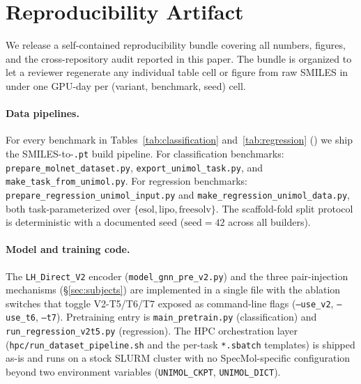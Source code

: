 
\section*{Reproducibility Artifact}
\label{sec:reproducibility}

We release a self-contained reproducibility bundle covering all numbers,
figures, and the cross-repository audit reported in this paper. The
bundle is organized to let a reviewer regenerate any individual table
cell or figure from raw SMILES in under one GPU-day per (variant,
benchmark, seed) cell.

\paragraph{Data pipelines.} For every benchmark in
Tables~\ref{tab:classification} and~\ref{tab:regression}
(\datasetlist) we ship the SMILES-to-\texttt{.pt} build pipeline. For
classification benchmarks: \texttt{prepare\_molnet\_dataset.py},
\texttt{export\_unimol\_task.py}, and \texttt{make\_task\_from\_unimol.py}.
For regression benchmarks: \texttt{prepare\_regression\_unimol\_input.py}
and \texttt{make\_regression\_unimol\_data.py}, both task-parameterized
over $\{\text{esol}, \text{lipo}, \text{freesolv}\}$. The scaffold-fold
split protocol is deterministic with a documented seed
($\mathrm{seed}{=}42$ across all builders).

\paragraph{Model and training code.} The
\texttt{LH\_Direct\_V2} encoder
(\texttt{model\_gnn\_pre\_v2.py}) and the three pair-injection mechanisms
(\S\ref{sec:subjects}) are implemented in a single file with the
ablation switches that toggle V2-T5/T6/T7 exposed as command-line flags
(\texttt{--use\_v2}, \texttt{--use\_t6}, \texttt{--t7}). Pretraining
entry is \texttt{main\_pretrain.py} (classification) and
\texttt{run\_regression\_v2t5.py} (regression). The HPC orchestration
layer (\texttt{hpc/run\_dataset\_pipeline.sh} and the per-task
\texttt{*.sbatch} templates) is shipped as-is and runs on a stock SLURM
cluster with no SpecMol-specific configuration beyond two environment
variables (\texttt{UNIMOL\_CKPT}, \texttt{UNIMOL\_DICT}).

